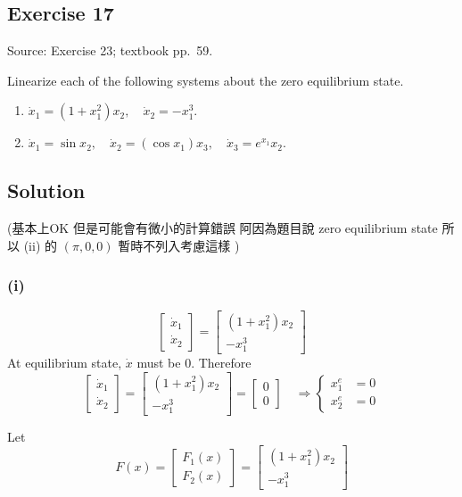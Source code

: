 \documentclass[12pt,a4paper]{article}
\newlength{\questionroom}
\newenvironment{questionprompt}{%
  \begin{lrbox}{\questionbox}\begin{minipage}{\linewidth}%
}{%
  \end{minipage}\end{lrbox}%
  \setlength{\questionroom}{\dimexpr\ht\questionbox+\dp\questionbox+5.2cm\relax}%
  \ifdim\questionroom>\textheight\setlength{\questionroom}{\textheight}\fi
  \Needspace{\questionroom}%
  \noindent\usebox{\questionbox}\par
}
\begin{document}
\begin{questionprompt}
\section*{Exercise 17}
\label{practice:17}
{\small Source: Exercise 23; textbook pp.~59.}\par
Linearize each of the following systems about the zero equilibrium state.
\begin{enumerate}[label=(\roman*)]
\item $\dot x_1=(1+x_1^2)x_2,\quad\dot x_2=-x_1^3$.
\item $\dot x_1=\sin x_2,\quad\dot x_2=(\cos x_1)x_3,\quad\dot x_3=e^{x_1}x_2$.
\end{enumerate}
\end{questionprompt}
\subsection*{Solution}
(基本上OK 但是可能會有微小的計算錯誤
阿因為題目說 zero equilibrium state 所以 (ii) 的 $(\pi, 0, 0)$ 
暫時不列入考慮這樣
)
\subsubsection*{(i)}

\[
\begin{bmatrix}
	\dot x_1 \\ \dot x_2
\end{bmatrix} = \begin{bmatrix}
 	(1 + x_1^2) x_2 \\
 	-x_1^3
\end{bmatrix}
\]
At equilibrium state, $\dot x$ must be $0$. Therefore
\[
\begin{bmatrix}
	\dot x_1 \\ \dot x_2
\end{bmatrix} = \begin{bmatrix}
	(1 + x_1^2) x_2  \\
	-x_1^3
\end{bmatrix} = \begin{bmatrix}
0 \\ 0
\end{bmatrix} \quad \Rightarrow \begin{cases}
x^e_1 & = 0 \\
x^e_2 & = 0
\end{cases}
\]

Let 
\[
F(x) = \begin{bmatrix}
	F_1(x) \\ F_2(x) 
\end{bmatrix} = \begin{bmatrix}
(1 + x_1^2) x_2 \\ -x_1^3
\end{bmatrix}
\]
\end{document}
